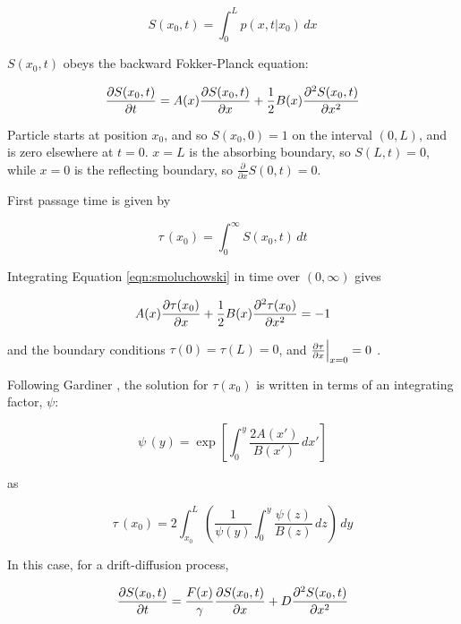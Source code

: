 \begin{equation}
S(x_0,t) = \int_{0}^{L} p(x,t \lvert x_0) \,dx
\label{eqn:survival}
\end{equation}

$S(x_0,t)$ obeys the backward Fokker-Planck equation:

\begin{equation}
\frac{\partial S(x_0,t)}{\partial t} = A(x) \frac{\partial S(x_0,t)}{\partial x} + \frac{1}{2} B(x) \frac{\partial^2 S(x_0,t)}{\partial x^2}
\label{eqn:smoluchowski_general}
\end{equation}

Particle starts at position $x_0$, and so $S(x_0,0) = 1$ on the interval $(0,L)$, and is zero elsewhere at $t=0$.  $x=L$ is the absorbing boundary, so $S(L,t)=0$, while $x=0$ is the reflecting boundary, so $\frac{\partial}{\partial x} S(0,t)=0$.

First passage time is given by

\begin{equation}
\tau \, (x_0) = \int_{0}^{\infty} S(x_0,t) \,dt
\label{eqn:first_passage}
\end{equation}

Integrating Equation \ref{eqn:smoluchowski} in time over $(0,\infty)$ gives

\begin{equation}
A(x) \frac{\partial \tau (x_0)}{\partial x} + \frac{1}{2} B(x) \frac{\partial^2 \tau (x_0)}{\partial x^2} = -1
\label{eqn:first_passage}
\end{equation}

\noindent
and the boundary conditions $\tau(0)=\tau(L)=0$, and $\frac{\partial \tau}{\partial x} \Bigr|_{x=0} =0$ .

Following Gardiner \citep{Gardiner1985}, the solution for $\tau (x_0)$ is written in terms of an integrating factor, $\psi$:

\begin{equation}
\psi \, (y) = \exp \left [ \int_0^y \frac{2A(x')}{B(x')} \,dx' \right ]
\label{eqn:psi}
\end{equation}

\noindent
as

\begin{equation}
\tau \, (x_0) = 2 \int_{x_0}^{L} \left ( \frac{1}{\psi(y)} \int_{0}^{y} \frac{\psi(z)}{B(z)} \,dz \right ) \,dy
\label{eqn:first_passage_sol}
\end{equation}

In this case, for a drift-diffusion process,

\begin{equation}
\frac{\partial S(x_0,t)}{\partial t} = \frac{F(x)}{\gamma} \frac{\partial S(x_0,t)}{\partial x} + D \frac{\partial^2 S(x_0,t)}{\partial x^2}
\label{eqn:smoluchowski_final}
\end{equation}

